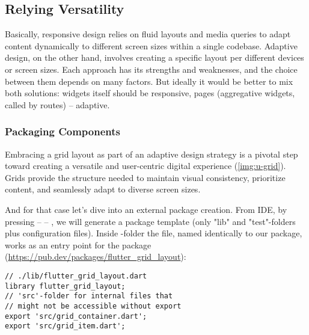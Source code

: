 
\newpage
\subsection{Relying Versatility}

Basically, responsive design relies on fluid layouts and media queries to adapt content dynamically to different screen 
sizes within a single codebase. Adaptive design, on the other hand, involves creating a specific layout per different 
devices or screen sizes. Each approach has its strengths and weaknesses, and the choice between them depends on many 
factors. But ideally it would be better to mix both solutions: widgets itself should be responsive, pages (aggregative 
widgets, called by routes) -- adaptive.


\subsubsection{Packaging Components}

Embracing a grid layout as part of an adaptive design strategy is a pivotal step toward creating a versatile and 
user-centric digital experience (\cref{img:u-grid}). Grids provide the structure needed to maintain visual consistency, 
prioritize content, and seamlessly adapt to diverse screen sizes.

And for that case let's dive into an external package creation. From IDE, by pressing  --  -- , we will generate a package template (only "lib" and "test"-folders plus configuration files). 
Inside -folder the file, named identically to our package, works as an entry point for the package
(\href{https://pub.dev/packages/flutter_grid_layout}{https://pub.dev/packages/flutter\_grid\_layout}):

\begin{lstlisting}
// ./lib/flutter_grid_layout.dart
library flutter_grid_layout;
// 'src'-folder for internal files that 
// might not be accessible without export
export 'src/grid_container.dart';
export 'src/grid_item.dart';
\end{lstlisting}


